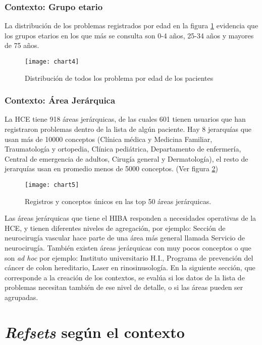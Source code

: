\subsubsection{Contexto: Grupo etario}
La distribución de los problemas registrados por edad en la figura \ref{fig:listaEdad} evidencia que los grupos etarios en los que más se consulta son 0-4 años, 25-34 años y mayores de 75 años.

\begin{figure}[htbp]
\caption{Distribución de todos los problema por edad de los pacientes}
\label{fig:listaEdad}
\centering
\texttt{[image: chart4]}
\end{figure}

\subsubsection{Contexto: Área Jerárquica}
La \acrshort{HCE} tiene 918 áreas jerárquicas, de las cuales 601 tienen usuarios que han registraron problemas dentro de la lista de algún paciente. Hay 8 jerarquías que usan más de \num{10000} conceptos (Clínica médica y Medicina Familiar, Traumatología y ortopedia, Clínica pediátrica, Departamento de enfermería, Central de emergencia de adultos, Cirugía general y Dermatología), el resto de jerarquías usan en promedio menos de 5000 conceptos. (Ver figura \ref{fig:listaArea})

\begin{figure}[htbp]
\caption{Registros y conceptos únicos en las top 50 áreas jerárquicas.}
\label{fig:listaArea}
\centering
\texttt{[image: chart5]}
\end{figure}

Las áreas jerárquicas que tiene el \acrshort{HIBA} responden a necesidades operativas de la \acrshort{HCE}, y tienen diferentes niveles de agregación, por ejemplo: Sección de neurocirugía vascular hace parte de una área más general llamada Servicio de neurocirugía. También existen áreas jerárquicas con muy pocos conceptos o que son \textit{ad hoc} por ejemplo: Instituto universitario H.I., Programa de prevención del cáncer de colon hereditario, Laser en rinosinusología. En la siguiente sección, que corresponde a la creación de los contextos, se evalúa si los datos de la lista de problemas necesitan también de ese nivel de detalle, o si las áreas pueden ser agrupadas.

\section{\textit{Refsets} según el contexto}

